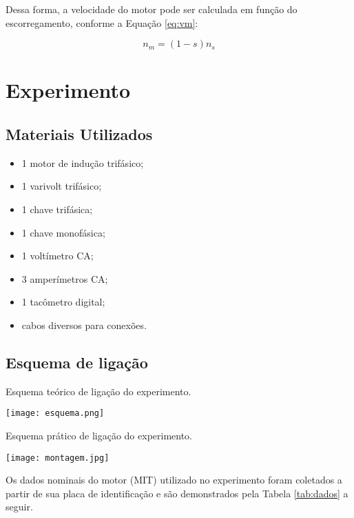 \documentclass[a4paper,12pt,oneside]{article}
\begin{document}
Dessa forma, a velocidade do motor pode ser calculada em função do escorregamento, conforme a Equação \ref{eq:vm}:

\begin{equation}\label{eq:vm}
n_m = (1-s)n_s
\end{equation}

\newpage
\section{Experimento}\hspace{0pt}

\subsection{Materiais Utilizados}

\begin{itemize}
\item 1 motor de indução trifásico;
\item 1 varivolt trifásico;
\item 1 chave trifásica;
\item 1 chave monofásica;
\item 1 voltímetro CA;
\item 3 amperímetros CA;
\item 1 tacômetro digital;
\item cabos diversos para conexões.
\end{itemize}

\subsection{Esquema de ligação}

\begin{center}
\captionsetup{type=figure}
\caption{Esquema teórico de ligação do experimento.}
\texttt{[image: esquema.png]}\label{fig:esquema}
\end{center}

\newpage
\begin{center}
\captionsetup{type=figure}
\caption{Esquema prático de ligação do experimento.}
\texttt{[image: montagem.jpg]}\label{fig:montagem}
\end{center}


Os dados nominais do motor (MIT) utilizado no experimento foram coletados a partir de sua placa de identificação e são demonstrados pela Tabela \ref{tab:dados} a seguir.
\end{document}
